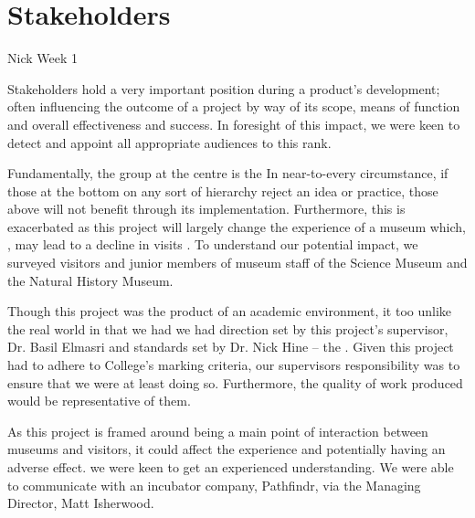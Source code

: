 \section{Stakeholders}
Nick Week 1

Stakeholders hold a very important position during a product's development; often influencing the outcome of a project by way of its scope, means of function and overall effectiveness and success. In foresight of this impact, we were keen to detect and appoint all appropriate audiences to this rank.

Fundamentally, the group at the centre is the  In near-to-every circumstance,  if those at the bottom on any sort of hierarchy reject an idea or practice, those above will not benefit through its implementation. Furthermore, this is exacerbated as this project will largely change the  experience of a museum which, , may lead to a decline in visits . To understand our potential impact, we surveyed visitors and junior members of museum staff of the Science Museum and the Natural History Museum. 

Though this project was the product of an academic environment, it  too unlike the real world in that we had we had direction set by this project’s supervisor, Dr. Basil Elmasri  and standards set by Dr. Nick Hine – the . Given this project had to adhere to College's marking criteria, our supervisors responsibility was to ensure that we were at least doing so. Furthermore, the quality of work  produced would  be representative of them. 

As this project is framed around being a main point of interaction between museums and visitors, it could affect the experience and potentially having an adverse effect.   we were keen to get an experienced understanding. We were able to communicate with an incubator company, Pathfindr, via the Managing Director, Matt Isherwood.  

